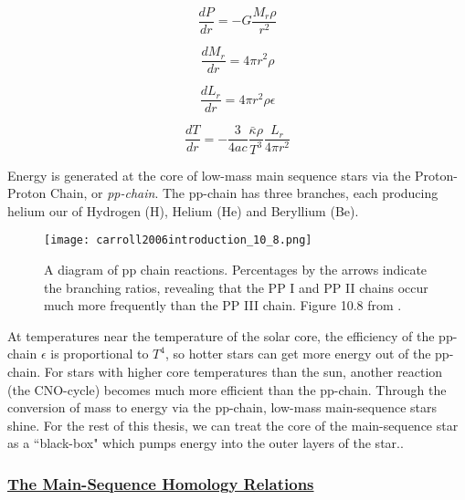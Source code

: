 \documentclass[12pt]{article} %
\numberwithin{equation}{section} %
\begin{document}
\begin{equation} \label{stellar_structure1}
\frac{dP}{dr} = -G \frac{M_{r} \rho}{r^{2}} 
\end{equation}

\begin{equation} \label{stellar_structure2}
\frac{dM_{r}}{dr} = 4 \pi r^{2} \rho
\end{equation}

\begin{equation} \label{stellar_structure3}
\frac{dL_{r}}{dr} = 4 \pi r^{2} \rho \epsilon
\end{equation}

\begin{equation} \label{stellar_structure4}
\frac{dT}{dr} = - \frac{3}{4ac} \frac{\bar{\kappa} \rho}{T^{3}} \frac{L_{r}}{4 \pi r^{2}}
\end{equation}

Energy is generated at the core of low-mass main sequence stars via the Proton-Proton Chain, or \emph{pp-chain}. The pp-chain has three branches, each producing helium our of Hydrogen (H), Helium (He) and Beryllium (Be). 

\begin{figure}[H]
\centering
\texttt{[image: carroll2006introduction\_10\_8.png]}
\caption{A diagram of pp chain reactions. Percentages by the arrows indicate the branching ratios, revealing that the PP I and PP II chains occur much more frequently than the PP III chain. Figure 10.8 from \citet{carroll2006introduction}.}
\label{fig: carroll2006introduction_10_8}
\end{figure}

At temperatures near the temperature of the solar core, the efficiency of the pp-chain $\epsilon$ is proportional to $T^{4}$, so hotter stars can get more energy out of the pp-chain. For stars with higher core temperatures than the sun, another reaction (the CNO-cycle) becomes much more efficient than the pp-chain. Through the conversion of mass to energy via the pp-chain, low-mass main-sequence stars shine. For the rest of this thesis, we can treat the core of the main-sequence star as a ``black-box" which pumps energy into the outer layers of the star..

\subsubsection[The Main-Sequence Homology Relations]{\hyperlink{toc}{The Main-Sequence Homology Relations}} \label{sec: The Main-Sequence Homology Relations}
\end{document}
